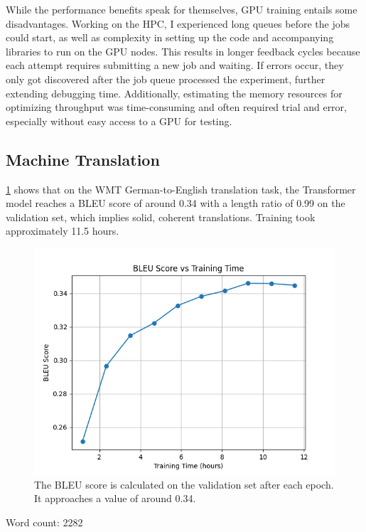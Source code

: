 While the performance benefits speak for themselves, GPU training entails some disadvantages.
Working on the HPC, I experienced long queues before the jobs could start, as well as complexity in setting up the code and accompanying libraries to run on the GPU nodes.
This results in longer feedback cycles because each attempt requires submitting a new job and waiting.
If errors occur, they only got discovered after the job queue processed the experiment, further extending debugging time.
Additionally, estimating the memory resources for optimizing throughput was time-consuming and often required trial and error, especially without easy access to a GPU for testing.

\clearpage
\subsection{Machine Translation}
\cref{fig:bleu} shows that on the WMT German-to-English translation task, the Transformer model reaches a BLEU score of around 0.34 with a length ratio of 0.99 on the validation set, which implies solid, coherent translations.
Training took approximately 11.5 hours.


\begin{figure}[ht]
    \begin{center}
        \includegraphics[width=\textwidth]{figures/bleu_score_val_20250129_142747.png}
    \end{center}
    \caption{The BLEU score is calculated on the validation set after each epoch. It approaches a value of around 0.34.}
    \label{fig:bleu}
\end{figure}
Word count: 2282
